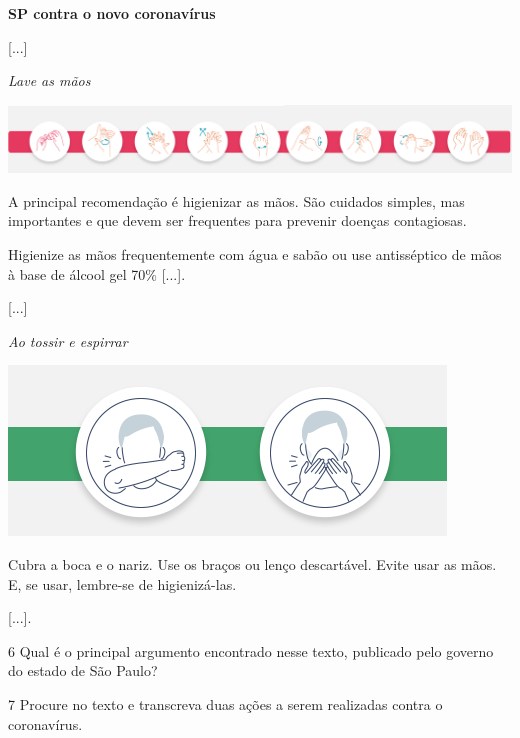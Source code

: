 \begin{myquote}
\textbf{SP contra o novo coronavírus}

{[}...{]}

\textit{Lave as mãos}

\includegraphics[width=\textwidth]{./imgs/img12ab.png}

A principal recomendação é higienizar as mãos. São cuidados simples,
mas importantes e que devem ser frequentes para prevenir doenças
contagiosas.

Higienize as mãos frequentemente com água e sabão ou use antisséptico de
mãos à base de álcool gel 70\% {[}...{]}.

{[}...{]}

\begin{center}
\textit{Ao tossir e espirrar}

\includegraphics[width=.5\textwidth]{./imgs/img14.png}
\end{center}

Cubra a boca e o nariz. Use os braços ou lenço descartável. Evite usar
as mãos. E, se usar, lembre-se de higienizá-las.

{[}...{]}.

\end{myquote}

\num{6} Qual é o principal argumento encontrado nesse texto, publicado pelo governo do estado de São Paulo?



\num{7} Procure no texto e transcreva duas ações a serem realizadas contra o
coronavírus.


